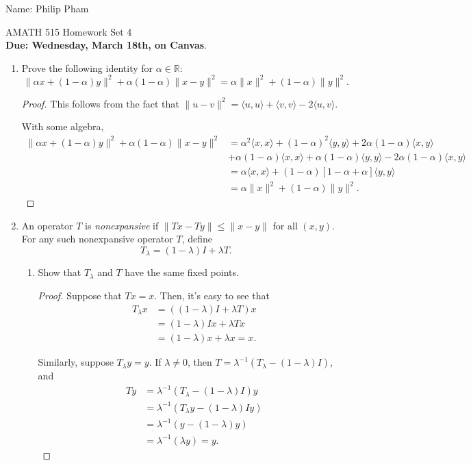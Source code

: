 \documentclass[11pt]{amsart}
\begin{document}
{\Large Name: Philip Pham}  \\
\begin{center}
\Large AMATH 515 \hskip 2in Homework Set 4\\
{\bf Due: Wednesday, March 18th, on Canvas}. 
\end{center}
\bigskip
\begin{enumerate}

\item  Prove the following identity for $\alpha \in \mathbb{R}$:
\[
\|\alpha x + (1-\alpha) y\|^2 + \alpha(1-\alpha) \|x-y\|^2 = \alpha \|x\|^2 + (1-\alpha) \|y\|^2.
\]

\begin{proof}
  This follows from the fact that
  $\| u - v \|^2 = \langle u, u \rangle + \langle v, v \rangle -
  2\langle u, v \rangle$.

  With some algebra,
  \begin{align*}
    \|\alpha x + (1-\alpha) y\|^2 + \alpha(1-\alpha) \|x-y\|^2
    &= \alpha^2 \langle x, x \rangle + (1-\alpha)^2 \langle y, y \rangle
      + 2\alpha(1-\alpha)\langle x, y \rangle \\
    & + \alpha(1-\alpha)\langle x, x \rangle + \alpha(1-\alpha)\langle y, y \rangle
      -2\alpha(1-\alpha)\langle x, y \rangle\\
    &= \alpha \langle x, x \rangle + (1-\alpha)\left[1 - \alpha + \alpha\right]\langle y, y \rangle \\
    &=\alpha \|x\|^2 + (1-\alpha) \|y\|^2.
  \end{align*}
\end{proof}


\item An operator $T$ is {\it nonexpansive} if  $\|Tx - Ty\| \leq \|x - y\|$ for all $(x,y)$. 
For any such nonexpansive operator $T$, define 
\[
T_\lambda = (1-\lambda)I + \lambda T. 
\]
\begin{enumerate}
\item Show that $T_\lambda$ and $T$ have the same fixed points.
  \begin{proof}
    Suppose that $Tx = x$. Then, it's easy to see that
    \begin{align*}
      T_\lambda x
      &= \left((1-\lambda)I + \lambda T\right)x \\
      &= (1-\lambda)Ix + \lambda Tx \\
      &= (1-\lambda)x + \lambda x = x.
    \end{align*}

    Similarly, suppose $T_\lambda y = y$. If $\lambda \neq 0$, then
    $T = \lambda^{-1}\left(T_\lambda - (1-\lambda)I\right)$, and
    \begin{align*}
      Ty
      &= \lambda^{-1}\left(T_\lambda - (1-\lambda)I\right)y \\
      &=\lambda^{-1}\left(T_\lambda y -  (1-\lambda)Iy\right) \\
      &=\lambda^{-1}\left(y - \left(1 - \lambda\right)y\right) \\
      &=\lambda^{-1}\left(\lambda y\right) = y.
    \end{align*}


\end{proof}
\end{enumerate}
\end{enumerate}
\end{document}
